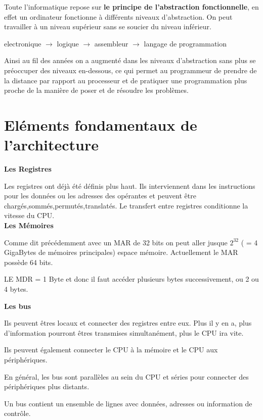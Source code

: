 \documentclass{report}
\begin{document}
Toute l'informatique repose sur {\bf le principe de l'abstraction fonctionnelle}, en effet un ordinateur fonctionne à différents niveaux d'abstraction. On peut travailler à un niveau supérieur sans se soucier du niveau inférieur.

\begin{center}
electronique $\rightarrow$ logique $\rightarrow$  assembleur $\rightarrow$ langage de programmation
 \end{center}

Ainsi au fil des années on a augmenté dans les niveaux d'abstraction sans plus se préoccuper des niveaux en-dessous, ce qui permet au programmeur de prendre de la distance par rapport au processeur et de pratiquer une programmation plus proche de la manière de poser et de résoudre les problèmes.

\section{Eléments fondamentaux de l'architecture}

{\bf Les Registres}


Les registres ont déjà été définis plus haut.
Ils interviennent dans les instructions pour les données ou les adresses des opérantes et peuvent être chargés,sommés,permutés,translatés.
Le transfert entre registres conditionne la vitesse du CPU.\\

{\bf Les Mémoires}

Comme dit précédemment avec un MAR de 32 bits on peut aller jusque $2^{32}$ ( = 4 GigaBytes de mémoires principales) espace mémoire. Actuellement le MAR possède 64 bits.

LE MDR = 1 Byte et donc il faut accéder plusieurs bytes successivement, ou 2 ou 4 bytes. 



{\bf Les bus}

Ils peuvent êtres locaux et connecter des registres entre eux. Plus il y en a, plus d'information pourront êtres transmises simultanément, plus le CPU ira vite.

Ils peuvent également connecter le CPU à la mémoire et le CPU aux périphériques.

En général, les bus sont parallèles au sein du CPU et séries pour connecter des périphériques plus distants.

Un bus contient un ensemble de lignes avec données, adresses ou information de contrôle.
\end{document}
